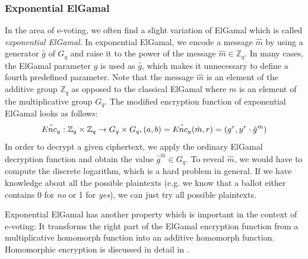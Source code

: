\documentclass[numbers=noenddot, abstract=on, a4paper, headsepline,
footsepline, oneside, draft=off]{scrreprt}
\begin{document}
\subsubsection{Exponential ElGamal}
\label{sec:expelgamal}
In the area of e-voting, we often find a slight variation of ElGamal which is
called \emph{exponential ElGamal}. In exponential ElGamal, we encode a message
$\hat{m}$ by using a generator $\hat{g}$ of $G_q$ and raise it to the power of
the message $\hat{m} \in \mathbb{Z}_q$. In many cases, the ElGamal parameter $g$
is used as $\hat{g}$, which makes it unnecessary to define a fourth predefined
parameter. Note that the message $\hat{m}$ is an element of the additive group
$\mathbb{Z}_q$ as opposed to the classical ElGamal where $m$ is an element of
the multiplicative group $G_q$. The modified encryption function of exponential
ElGamal looks as follows:
\begin{equation}
\hat{Enc_y} : \mathbb{Z}_q \times \mathbb{Z}_q \rightarrow G_q \times G_q,
(a, b)=\hat{Enc_y}(\hat{m}, r)=(g^r, y^r \cdot \hat{g}^{\hat{m}}) \notag
\end{equation}
In order to decrypt a given ciphertext, we apply the ordinary ElGamal decryption
function and obtain the value $\hat{g}^{\hat{m}} \in G_q$. To reveal $\hat{m}$,
we would have to compute the discrete logarithm, which is a hard problem in
general. If we have knowledge about all the possible plaintexts (e.g. we know
that a ballot either contains 0 for \emph{no} or 1 for \emph{yes}), we can just try all
possible plaintexts. 

Exponential ElGamal has another property which is important in the context of
e-voting: It transforms the right part of the ElGamal encryption function from a
multiplicative homomorph function into an additive homomorph function.
Homomorphic encryption is discussed in detail in .
\end{document}
